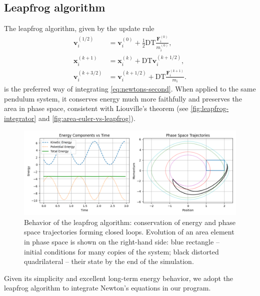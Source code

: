 \subsection{Leapfrog algorithm}
The leapfrog algorithm, given by the update rule \cite{young_leapfrog_2019}
\begin{equation}\label{eq:leapfrog}
    \begin{aligned}
        \mathbf{v}_{i}^{(1/2)} & = \mathbf{v}_i^{(0)} + \frac{1}{2}\textrm{DT} \frac{\mathbf{F}_i^{(0)}}{ m_i^{(0)}}, \\
        \mathbf{x}_i^{(k+1)}   & = \mathbf{x}_i^{(k)} + \textrm{DT} \mathbf{v}_i^{(k+1/2)},                           \\
        \mathbf{v}_i^{(k+3/2)} & = \mathbf{v}_i^{(k+1/2)} + \textrm{DT} \frac{ \mathbf{F}_i^{(k+1)}}{m_i}.
    \end{aligned}
\end{equation}
is the preferred way of integrating \autoref{eq:newtons-second}.
When applied to the same pendulum system, it conserves energy much more faithfully and preserves the area in phase space, consistent with Liouville's theorem (see \autoref{fig:leapfrog-integrator} and \autoref{fig:area-euler-vs-leapfrog}).
\begin{figure}[htp]
    \centering
    \includegraphics[scale=0.6]{img/integrators/leapfrog-pendulum.png}
    \caption{Behavior of the leapfrog algorithm: conservation of energy and phase space trajectories forming closed loops.
        Evolution of an area element in phase space is shown on the right-hand side: blue rectangle -- initial conditions for many copies of the system; black distorted quadrilateral -- their state by the end of the simulation.}
    \label{fig:leapfrog-integrator}
\end{figure}
Given its simplicity and excellent long-term energy behavior, we adopt the leapfrog algorithm to integrate Newton's equations in our program.